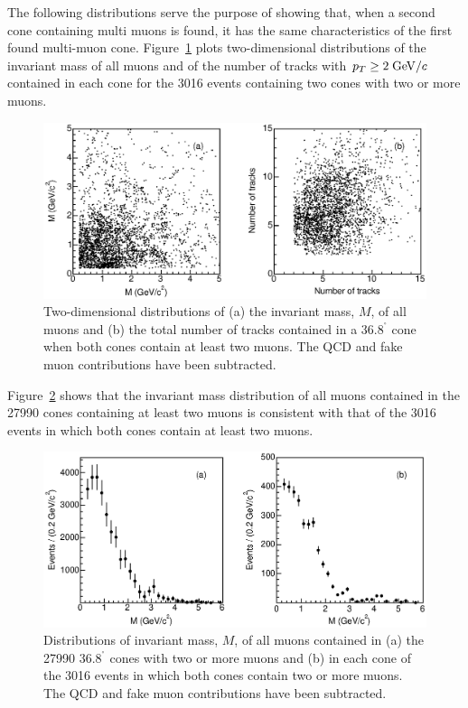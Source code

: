 \documentclass[aps,prd,preprint,floatfix,nofootinbib,superscriptaddress,showpacs,amssymb]{revtex4}
\def\deg{^\circ}
\begin{document}
 The following distributions serve the purpose of 
 showing that, when a second cone containing multi muons is found,
 it has the same characteristics of the first found multi-muon cone.
 Figure~\ref{fig:fig_19} plots two-dimensional distributions of the
 invariant mass of all muons and of the number of tracks with
 $p_T \geq  2 \; {\rm GeV/}c$ contained in each cone for the 3016 events
 containing two cones with two or more muons.
 \begin{figure}
 \begin{center}
 \vspace{-0.3in}
 \leavevmode
 \includegraphics*[width=\textwidth]{fa0_19.eps}
 \caption[]{Two-dimensional distributions of (a) the invariant mass, $M$, 
            of all muons and (b) the total number of tracks contained in a 
            $36.8^{\deg}$ cone when both cones contain at least two muons.
            The QCD and fake muon contributions have been subtracted.}
 \label{fig:fig_19}
 \end{center}
 \end{figure}
 Figure~\ref{fig:fig_20} shows that the invariant mass distribution of
 all muons contained in the 27990 cones containing at least two muons
 is consistent with that of the 3016 events in which both cones contain
 at least two muons.  
 \begin{figure}
 \begin{center}
 \vspace{-0.3in}
 \leavevmode
 \includegraphics*[width=\textwidth]{fa0_20.eps}
 \caption[]{Distributions of invariant mass, $M$, of all muons contained
            in (a) the 27990 $36.8^{\deg}$ cones with two or more muons
            and (b) in each cone of  the 3016 events in which both cones
            contain two or more muons. The QCD and fake muon contributions
            have been subtracted. }
 \label{fig:fig_20}
 \end{center}
 \end{figure}
\end{document}
